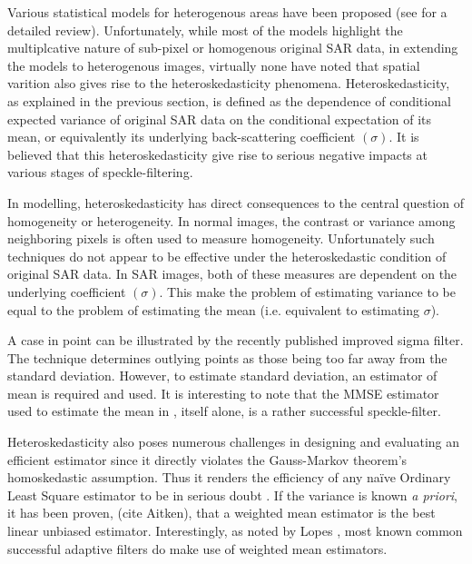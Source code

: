 \documentclass[journal]{IEEEtran}
\begin{document}


Various statistical models for heterogenous areas have been proposed (see \cite{Touzi_2002_TGRS} for a detailed review). Unfortunately, while most of the models highlight the multiplcative nature of sub-pixel or homogenous original SAR data, in extending the models to heterogenous images, virtually none have noted that spatial varition also gives rise to the heteroskedasticity phenomena. Heteroskedasticity, as explained in the previous section, is defined as the dependence of conditional expected variance of original SAR data on the conditional expectation of its mean, or equivalently its underlying back-scattering coefficient $(\sigma)$. It is believed that this heteroskedasticity give rise to serious negative impacts at various stages of speckle-filtering. 

In modelling, heteroskedasticity has direct consequences to the central question of homogeneity or heterogeneity. In normal images, the contrast or variance among neighboring pixels is often used to measure homogeneity. Unfortunately such techniques do not appear to be effective under the heteroskedastic condition of original SAR data. In SAR images, both of these measures are dependent on the underlying coefficient $(\sigma)$. This make the problem of estimating variance to be equal to the problem of estimating the mean (i.e. equivalent to estimating $\sigma$).

A case in point can be illustrated by the recently published improved sigma filter\cite{Lee_TGRS_2009}. The technique determines outlying points as those being too far away from the standard deviation. However, to estimate standard deviation, an estimator of mean is required and used. It is interesting to note that the MMSE estimator used to estimate the mean in \cite{Lee_TGRS_2009}, itself alone, is a rather successful speckle-filter\cite{Lee_PAMI_1980}.

Heteroskedasticity also poses numerous challenges in designing and evaluating an efficient estimator since it directly violates the Gauss-Markov theorem's homoskedastic assumption. 
Thus it renders the efficiency of any na\"{i}ve Ordinary Least Square estimator to be in serious doubt \cite{Furno_1991_JStatCompSimul}. 
If the variance is known \textit{a priori}, it has been proven, (cite Aitken), that a weighted mean estimator is the best linear unbiased estimator. 
Interestingly, as noted by Lopes \cite{Lopes_TGRS_1990}, most known common successful adaptive filters \cite{Lee_PAMI_1980} \cite{Kuan_1985_PAMI} \cite{Frost_PAMI_1982} do make use of weighted mean estimators. 
\end{document}
